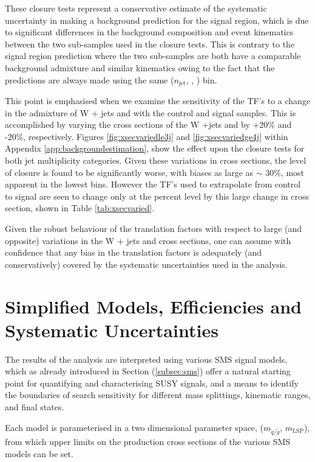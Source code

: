 These closure tests represent a conservative estimate of the systematic uncertainty in making a background prediction for the signal region, which is due to significant differences in the background composition and event kinematics between the two sub-samples used in the closure tests. This is contrary to the signal region prediction where the two sub-samples are both have a comparable background admixture and similar kinematics owing to the fact that the predictions are always made using the same ($n_{\text{jet}}$, \nbreco, \theht) bin.

This point is emphasised when we examine the sensitivity of the \ac{TF}'s to a change in the admixture of W + jets and \ttbar with the control and signal samples. This is accomplished by varying the cross sections of the W +jets and \ttbar by +20\% and -20\%, respectively. Figures \ref{fig:xsecvariedle3j} and \ref{fig:xsecvariedge4j} within Appendix \ref{app:backgroundestimation}, show the effect upon the closure tests for both jet multiplicity categories. Given these variations in cross sections, the level of closure is found to be significantly worse, with biases as large as $\sim$ 30\%, most apparent in the lowest \theht bins. However the \ac{TF}'s used to extrapolate from control to signal are seen to change only at the percent level by this large change in cross section, shown in Table \ref{tab:xsecvaried}.

Given the robust behaviour of the translation factors with respect to large (and opposite) variations in the W + jets and \ttbar cross sections, one can assume with confidence that any bias in the translation factors is adequately (and conservatively) covered by the systematic uncertainties used in the analysis.

\section{Simplified Models, Efficiencies and Systematic Uncertainties}
\label{sec:smsmodels}

The results of the analysis are interpreted using various \ac{SMS} signal models, which as already introduced in Section (\ref{subsec:sms}) offer a natural starting point for quantifying and characterising \ac{SUSY} signals, and a means to identify the boundaries of search sensitivity for different mass splittings, kinematic ranges, and final states. 

Each model is parameterised in a two dimensional parameter space, ($m_{\widetilde{q}/\widetilde{g}}$, $m_{\text{LSP}}$), from which upper limits on the production cross sections of the various \ac{SMS} models can be set.

